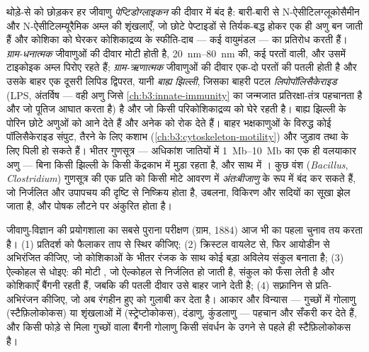 \begin{definition}[आवरण]\label{def:b3:bacteriology:envelope}
थोड़े-से को छोड़कर हर जीवाणु \emph{पेप्टिडोग्लाइकन} की दीवार में बंद है:
बारी-बारी से N-ऐसीटिलग्लूकोसैमीन और N-ऐसीटिलम्यूरैमिक अम्ल की शृंखलाएँ,
जो छोटे पेप्टाइडों से तिर्यक-बद्ध होकर एक ही अणु बन जाती हैं और कोशिका
को घेरकर कोशिकाद्रव्य के स्फीति-दाब --- कई वायुमंडल --- का प्रतिरोध
करती हैं। \emph{ग्राम-धनात्मक} जीवाणुओं की दीवार मोटी होती है,
\qtyrange{20}{80}{nm} की, कई परतों वाली, और उसमें टाइकोइक अम्ल पिरोए
रहते हैं; \emph{ग्राम-ऋणात्मक} जीवाणुओं की दीवार एक-दो परतों की पतली
होती है और उसके बाहर एक दूसरी लिपिड द्विपरत, यानी \emph{बाह्य झिल्ली},
जिसका बाहरी पटल \emph{लिपोपॉलिसैकेराइड} (LPS, अंतर्विष --- वही अणु
जिसे \cref{ch:b3:innate-immunity} का जन्मजात प्रतिरक्षा-तंत्र पहचानता
है और जो पूतिज आघात करता है) है और जो किसी परिकोशिकाद्रव्य को घेरे रहती
है। बाह्य झिल्ली के पोरिन छोटे अणुओं को आने देते हैं और अनेक
 को रोक देते हैं। बाहर भक्षकाणुओं के विरुद्ध कोई
पॉलिसैकेराइड संपुट, तैरने के लिए कशाभ
(\cref{ch:b3:cytoskeleton-motility}) और जुड़ाव तथा
 के लिए पिली हो सकते हैं। भीतर गुणसूत्र --- अधिकांश जातियों में
\qtyrange{1}{10}{Mb} का एक ही वलयाकार अणु --- बिना किसी झिल्ली के किसी
केंद्रकाभ में मुड़ा रहता है, और साथ में । कुछ वंश
(\emph{Bacillus}, \emph{Clostridium}) गुणसूत्र की एक प्रति को किसी मोटे
आवरण में \emph{अंतःबीजाणु} के रूप में बंद कर सकते हैं, जो निर्जलित और
उपापचय की दृष्टि से निष्क्रिय होता है, उबलना, विकिरण और सदियों का सूखा
झेल जाता है, और पोषक लौटने पर अंकुरित होता है।
\end{definition}

\begin{method}[ग्राम अभिरंजन]\label{met:b3:bacteriology:gram}
जीवाणु-विज्ञान की प्रयोगशाला का सबसे पुराना परीक्षण (ग्राम, 1884) आज भी
 का पहला चुनाव तय करता है। (1) प्रतिदर्श को फैलाकर ताप से
स्थिर कीजिए; (2) क्रिस्टल वायलेट से, फिर आयोडीन से अभिरंजित कीजिए, जो
कोशिकाओं के भीतर रंजक के साथ कोई बड़ा अविलेय संकुल बनाता है; (3) ऐल्कोहल
से धोइए:  की मोटी , जो ऐल्कोहल से
निर्जलित हो जाती है, संकुल को फँसा लेती है और कोशिकाएँ बैंगनी रहती हैं,
जबकि  की पतली दीवार उसे बाहर जाने देती है; (4) सफ़्रानिन
से प्रति-अभिरंजन कीजिए, जो अब रंगहीन हुए  को गुलाबी कर
देता है। आकार और विन्यास --- गुच्छों में गोलाणु (स्टैफ़िलोकोकस) या
शृंखलाओं में (स्ट्रेप्टोकोकस), दंडाणु, कुंडलाणु --- पहचान और सँकरी कर
देते हैं, और किसी फोड़े से मिला गुच्छों वाला बैंगनी गोलाणु किसी
संवर्धन के उगने से पहले ही स्टैफ़िलोकोकस है।
\end{method}


